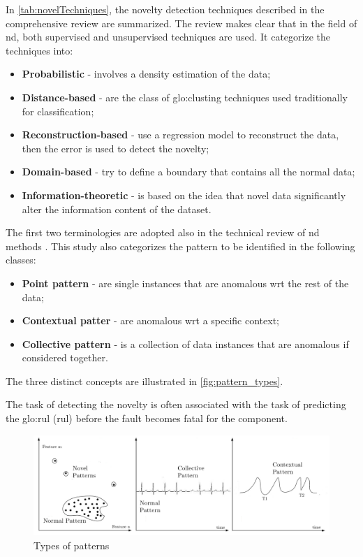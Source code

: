 In \autoref{tab:novelTechniques}, the novelty detection techniques described in the comprehensive review \cite{NoveltyReview} are summarized. The review makes clear that in the field of \gls{nd}, both supervised and unsupervised techniques are used. It categorize the techniques into:
\begin{itemize}
    \item \textbf{Probabilistic} - involves a density estimation of the data;
    \item \textbf{Distance-based} - are the class of \gls{glo:clust}ing techniques used traditionally for classification;
    \item \textbf{Reconstruction-based} - use a regression model to reconstruct the data, then the error is used to detect the novelty;
    \item \textbf{Domain-based} - try to define a boundary that contains all the normal data;
    \item \textbf{Information-theoretic} - is based on the idea that novel data significantly alter the information content of the dataset.
\end{itemize}

{}

The first two terminologies are adopted also in the technical review of \gls{nd} methods \cite{NoveltyTech}. This study also categorizes the pattern to be identified in the following classes:
\begin{itemize}
    \item \textbf{Point pattern} - are single instances that are anomalous \gls{wrt} the rest of the data;
    \item \textbf{Contextual patter} - are anomalous \gls{wrt} a specific context;
    \item \textbf{Collective pattern} - is a collection of data instances that are anomalous if considered together.
\end{itemize}

The three distinct concepts are illustrated in \autoref{fig:pattern_types}.

The task of detecting the novelty is often associated with the task of predicting the \gls{glo:rul} (\gls{rul}) before the fault becomes fatal for the component.

\begin{figure}
    \centering
    \includegraphics[width=\textwidth]{images/StateArt/patterns.png}
    \caption{Types of patterns \cite{NoveltyTech}}
    \label{fig:pattern_types}
\end{figure}

